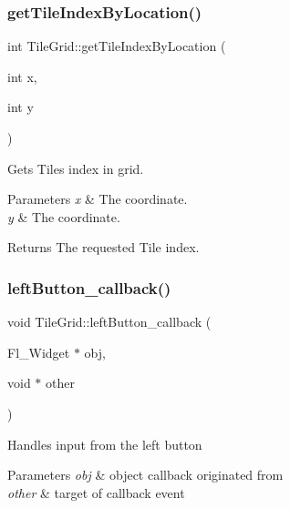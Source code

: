 \subsubsection{\texorpdfstring{get\+Tile\+Index\+By\+Location()}{getTileIndexByLocation()}}
{\footnotesize\ttfamily int Tile\+Grid\+::get\+Tile\+Index\+By\+Location (\begin{DoxyParamCaption}\item[{int}]{x,  }\item[{int}]{y }\end{DoxyParamCaption})}

Gets Tile\textquotesingle{}s index in grid.


\begin{DoxyParams}{Parameters}
{\em x} & The coordinate. \\
\hline
{\em y} & The coordinate. \\
\hline
\end{DoxyParams}
\begin{DoxyReturn}{Returns}
The requested Tile index. 
\end{DoxyReturn}
\mbox{\label{classTileGrid_a8166f451ae77dcf4015cefbe2cc72a74}} 
\subsubsection{\texorpdfstring{left\+Button\+\_\+callback()}{leftButton\_callback()}}
{\footnotesize\ttfamily void Tile\+Grid\+::left\+Button\+\_\+callback (\begin{DoxyParamCaption}\item[{Fl\+\_\+\+Widget $\ast$}]{obj,  }\item[{void $\ast$}]{other }\end{DoxyParamCaption})\hspace{0.3cm}{\ttfamily [static]}}

Handles input from the left button


\begin{DoxyParams}{Parameters}
{\em obj} & object callback originated from \\
\hline
{\em other} & target of callback event \\
\hline
\end{DoxyParams}
\mbox{\label{classTileGrid_a24ab97ce925a5bbdd467c7d91d2d28c7}} 
